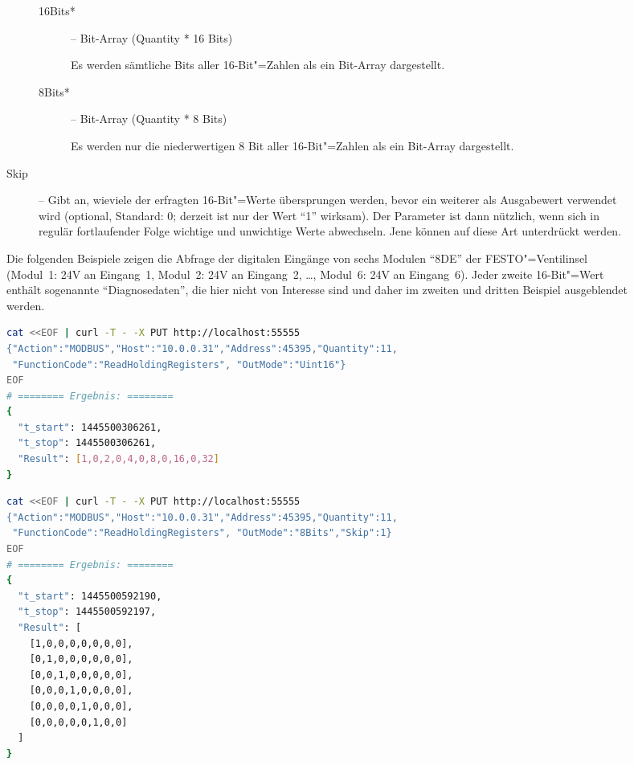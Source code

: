 \documentclass[titlepage=false,toc=nobibliography]{vl-report}
\begin{document}
\begin{description}
\begin{description}
\begin{description}
\begin{description}
            \item[16Bits*] -- Bit-Array (Quantity * 16 Bits)\par\noindent
              Es werden sämtliche Bits aller 16-Bit"=Zahlen als ein Bit-Array
              dargestellt.

            \item[8Bits*] -- Bit-Array (Quantity * 8 Bits) \par\noindent
              Es werden nur die niederwertigen 8 Bit aller
              16-Bit"=Zahlen als ein Bit-Array dargestellt.

          \end{description}

        \item[Skip] -- Gibt an, wieviele der erfragten 16-Bit"=Werte
        übersprungen werden, bevor ein weiterer als Ausgabewert verwendet wird
        (optional, Standard: 0; derzeit ist nur der Wert "`1"' wirksam). Der
        Parameter ist dann nützlich, wenn sich in regulär fortlaufender Folge
        wichtige und unwichtige Werte abwechseln. Jene können auf diese Art
        unterdrückt werden.

      \end{description}

\noindent Die folgenden Beispiele zeigen die Abfrage der digitalen Eingänge von
sechs Modulen "`8DE"' der FESTO"=Ventilinsel (Modul~1: 24V an Eingang~1,
Modul~2: 24V an Eingang~2, \dots, Modul~6: 24V an Eingang~6). Jeder zweite
16-Bit"=Wert enthält sogenannte "`Diagnosedaten"', die hier nicht von
Interesse sind und daher im zweiten und dritten Beispiel ausgeblendet werden.

\begin{lstlisting}[language=bash]
cat <<EOF | curl -T - -X PUT http://localhost:55555
{"Action":"MODBUS","Host":"10.0.0.31","Address":45395,"Quantity":11,
 "FunctionCode":"ReadHoldingRegisters", "OutMode":"Uint16"}
EOF
# ======== Ergebnis: ========
{
  "t_start": 1445500306261,
  "t_stop": 1445500306261,
  "Result": [1,0,2,0,4,0,8,0,16,0,32]
}
\end{lstlisting}

\begin{lstlisting}[language=bash]
cat <<EOF | curl -T - -X PUT http://localhost:55555
{"Action":"MODBUS","Host":"10.0.0.31","Address":45395,"Quantity":11,
 "FunctionCode":"ReadHoldingRegisters", "OutMode":"8Bits","Skip":1}
EOF
# ======== Ergebnis: ========
{
  "t_start": 1445500592190,
  "t_stop": 1445500592197,
  "Result": [
    [1,0,0,0,0,0,0,0],
    [0,1,0,0,0,0,0,0],
    [0,0,1,0,0,0,0,0],
    [0,0,0,1,0,0,0,0],
    [0,0,0,0,1,0,0,0],
    [0,0,0,0,0,1,0,0]
  ]
}
\end{lstlisting}


\end{description}
\end{description}
\end{document}
